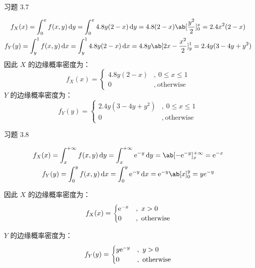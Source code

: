 \begin{problem}
    习题 3.7
    \begin{solution}
        $$
        \begin{gathered}
            f_X(x) = \int_0^x f(x, y) \dd{y} = \int_0^x 4.8 y (2 - x) \dd{y} = 4.8(2 - x) \ab[\frac{y^2}{2}]_0^x = 2.4 x^2 (2 - x) \\
            f_Y(y) = \int_y^1 f(x, y) \dd{x} = \int_y^1 4.8 y (2 - x) \dd{x} = 4.8y \ab[2x - \frac{x^2}{2}]_y^1 = 2.4y (3 - 4y + y^2)
        \end{gathered}
        $$
        因此 $X$ 的边缘概率密度为：
        $$
        f_X(x) = \begin{cases}
            4.8y (2 - x) &,\ 0 \le x \le 1 \\
            0 &,\ \text{otherwise}
        \end{cases}
        $$
        $Y$ 的边缘概率密度为：
        $$
        f_Y(y) = \begin{cases}
            2.4y (3 - 4y + y^2) &,\ 0 \le x \le 1 \\
            0 &,\ \text{otherwise}
        \end{cases}
        $$
    \end{solution}
\end{problem}

\begin{problem}
    习题 3.8
    \begin{solution}
        $$
        \begin{gathered}
            f_X(x) = \int_x^{+\infty} f(x, y) \dd{y} = \int_x^{+\infty} \E^{-y} \dd{y} = \ab[-\E^{-y}]_x^{+\infty} = \E^{-x} \\
            f_Y(y) = \int_0^y f(x, y) \dd{x} = \int_0^y \E^{-y} \dd{x} = \E^{-y} \ab[x]_0^y = ye^{-y}
        \end{gathered}
        $$

        因此 $X$ 的边缘概率密度为：
        $$
        f_X(x) = \begin{cases}
            \mathrm{e}^{-x} &,\ x > 0 \\
            0 &,\ \text{otherwise}
        \end{cases}
        $$

        $Y$ 的边缘概率密度为：
        $$
        f_Y(y) = \begin{cases}
            y \mathrm{e}^{-y} &,\ y > 0 \\
            0 &,\ \text{otherwise}
        \end{cases}
        $$
    \end{solution}
\end{problem}

